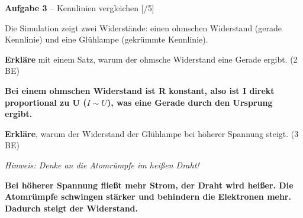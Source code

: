 \documentclass[11pt, a4paper]{article}
\newif\ifzeigesternchen
\newcommand{\lsg}[1]{\textcolor{loesung}{\textbf{#1}}}
\newcommand{\punktebox}[1]{\hfill\small\textcolor{mittelgrau}{[\hspace{0.8em}/#1]}}
\newcommand{\stern}[1]{\ifzeigesternchen\textsuperscript{\textcolor{fachfarbe}{(#1)}}\fi}
\newcommand{\aufgabe}[2]{%
    \needspace{4\baselineskip}%
    \vspace{8pt}%
    \noindent\textbf{\textcolor{fachfarbe}{Aufgabe #1}} #2%
    \vspace{4pt}%
    \nopagebreak[4]%
}
\newcommand{\operator}[1]{\textbf{#1}}
\begin{document}
\aufgabe{3}{\stern{**} – Kennlinien vergleichen} \punktebox{5}

Die Simulation zeigt zwei Widerstände: einen ohmschen Widerstand (gerade Kennlinie) und eine Glühlampe (gekrümmte Kennlinie).

\begin{teil}
    \item \operator{Erkläre} mit einem Satz, warum der ohmsche Widerstand eine Gerade ergibt. \hfill (2 BE)

    \lsg{Bei einem ohmschen Widerstand ist R konstant, also ist I direkt proportional zu U ($I \sim U$), was eine Gerade durch den Ursprung ergibt.}

    \vspace{0.3em}
    \item \operator{Erkläre}, warum der Widerstand der Glühlampe bei höherer Spannung steigt. \hfill (3 BE)

    \textit{Hinweis: Denke an die Atomrümpfe im heißen Draht!}

    \lsg{Bei höherer Spannung fließt mehr Strom, der Draht wird heißer. Die Atomrümpfe schwingen stärker und behindern die Elektronen mehr. Dadurch steigt der Widerstand.}
\end{teil}

\end{document}
